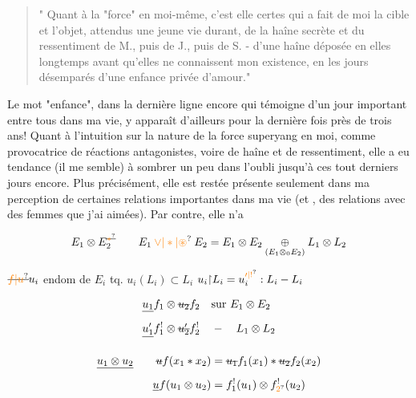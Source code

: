 \begin{quote}
" Quant à la "force" en moi-même, c'est elle certes qui a fait de moi la cible et l'objet, attendus une jeune vie durant, de la haîne secrète et du ressentiment de M., puis de J., puis de S. - d'une haîne déposée en elles longtemps avant qu'elles ne connaissent mon existence, en les jours désemparés d'une enfance privée d'amour."
\end{quote}

Le mot "enfance", dans la dernière ligne encore qui témoigne d'un jour important entre tous dans ma vie, y apparaît d'ailleurs pour la dernière fois  près de trois ans! Quant à l'intuition sur la nature de la force superyang en moi, comme provocatrice de réactions antagonistes, voire de haîne et de ressentiment, elle a eu tendance (il me semble) à sombrer un peu dans l'oubli jusqu'à ces tout derniers jours encore. Plus précisément, elle est restée présente seulement dans ma perception de certaines relations importantes dans ma vie (et , des relations avec des femmes que j'ai aimées). Par contre, elle n'a 


\[
E_1\otimes E_2^{\deleted{\unsure{\ast}}}\qquad
E_1\mathbin{\unsure{\vee|\ast|\circledast}}E_2=
E_1\otimes E_2\underset{(E_1\otimes_0 E_2)}{\oplus} L_1\otimes L_2
\]

$\deleted{\unsure{f|u}}u_i$ endom de $E_i$ tq. $u_i(L_i)\subset L_i$
\quad $u_i\mathord{\upharpoonright}L_i=u^{\unsure{\prime|!}}_i:L_i - L_i$


\[
\begin{aligned}
\deleted{u_1}f_1\otimes\deleted{u_2}f_2&\quad\text{sur }E_1\otimes E_2\\
\deleted{u'_1}f^{!}_1\otimes\deleted{u'_2}f^{!}_2&\quad -\quad L_1\otimes L_2
\end{aligned}
\]

\[
\begin{aligned}
\deleted{u_1\otimes u_2}\qquad \deleted{u}f(x_1\ast x_2)&=\deleted{u_1}f_1(x_1)\ast\deleted{u_2}f_2(x_2)\\
\deleted{u}f(u_1\otimes u_2)&=f^{!}_1(u_1)\otimes f^{!}_{\unsure{2}}(u_2)
\end{aligned}
\]


